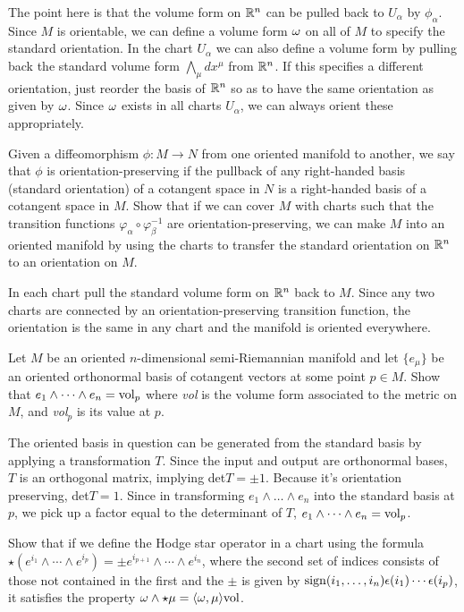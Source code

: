 The point here is that the volume form on $\mathbb{R}^n$ can be pulled back to $U_\alpha$ by $\phi_\alpha$. 
Since $M$ is orientable, we can define a volume form $\omega$ on all of $M$ to specify the standard orientation. In the chart
$U_\alpha$ we can also define a volume form by pulling back the standard volume form $\bigwedge_\mu dx^\mu$ from $\mathbb{R}^n$. 
If this specifies a different orientation, just reorder the basis of $\mathbb{R}^n$ so as to have the same orientation as given by $\omega$.
Since $\omega$ exists in all charts $U_\alpha$, we can always orient these appropriately.

\begin{p}{Given a diffeomorphism $\phi:M\rightarrow N$ from one oriented manifold to another, we say that $\phi$ is
orientation-preserving if the pullback of any right-handed basis (standard orientation) of a cotangent space in $N$ is a 
right-handed basis of a cotangent space in $M$. Show that if we can cover $M$ with charts
such that the transition functions $\varphi_\alpha\circ \varphi_\beta^{-1}$ are orientation-preserving, we 
can make $M$ into an oriented manifold by using the charts to transfer the 
standard orientation on $\mathbb{R}^n$ to an orientation on $M$.}
\end{p}

In each chart pull the standard volume form on $\mathbb{R}^n$ back to $M$. Since
any two charts are connected by an orientation-preserving transition function, the orientation is
the same in any chart and the manifold is oriented everywhere.\\

\begin{p}{Let $M$ be an oriented $n$-dimensional semi-Riemannian manifold and let $\{e_\mu\}$ be an oriented orthonormal
basis of cotangent vectors at some point $p\in M$. Show that $e_1\wedge\dots\wedge e_n={\rm vol}_p$ where \emph{vol} is 
the volume form associated to the metric on $M$, and \emph{vol}$_p$ is its value at $p$.}
\end{p}

The oriented basis in question can be generated from the standard basis by applying a transformation $T$. Since 
the input and output are orthonormal bases, $T$ is an orthogonal matrix, implying det$T=\pm 1$. 
Because it's orientation preserving, det$T=1$. Since in transforming $e_1\wedge\dots\wedge e_n$ into the standard
basis at $p$, we pick up a factor equal to the determinant of $T$,  $e_1\wedge\dots\wedge e_n={\rm vol}_p$.

\begin{p}{Show that if we define the Hodge star operator in a chart using the formula $\star(e^{i_1}\wedge \cdots \wedge
e^{i_p})=\pm e^{i_{p+1}}\wedge \cdots \wedge e^{i_n}$, where the second set of indices consists of those not contained in the
first and the $\pm$ is given by ${\rm sign}(i_1,\dots,i_n)\epsilon(i_1)\cdots \epsilon(i_p)$, it satisfies the property $\omega\wedge\star\mu=
\langle\omega,\mu\rangle{\rm vol}$.}
\end{p}

